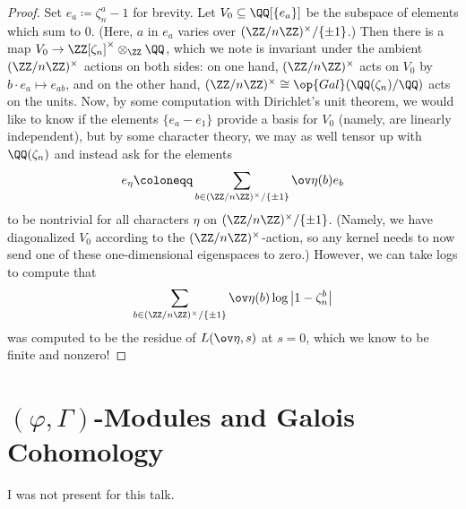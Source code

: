 \documentclass{article}
\begin{document}
\begin{proof}
	Set $e_a\coloneqq\zeta_n^a-1$ for brevity. Let $V_0\subseteq\QQ[\{e_a\}]$ be the subspace of elements which sum to $0$. (Here, $a$ in $e_a$ varies over $(\ZZ/n\ZZ)^\times/\{\pm1\}$.) Then there is a map $V_0\to\ZZ[\zeta_n]^\times\otimes_\ZZ\QQ$, which we note is invariant under the ambient $(\ZZ/n\ZZ)^\times$ actions on both sides: on one hand, $(\ZZ/n\ZZ)^\times$ acts on $V_0$ by $b\cdot e_a\mapsto e_{ab}$, and on the other hand, $(\ZZ/n\ZZ)^\times\cong\op{Gal}(\QQ(\zeta_n)/\QQ)$ acts on the units. Now, by some computation with Dirichlet's unit theorem, we would like to know if the elements $\{e_a-e_1\}$ provide a basis for $V_0$ (namely, are linearly independent), but by some character theory, we may as well tensor up with $\QQ(\zeta_n)$ and instead ask for the elements
	\[e_\eta\coloneqq\sum_{b\in(\ZZ/n\ZZ)^\times/\{\pm1\}}\ov\eta(b)e_b\]
	to be nontrivial for all characters $\eta$ on $(\ZZ/n\ZZ)^\times/\{\pm1\}$. (Namely, we have diagonalized $V_0$ according to the $(\ZZ/n\ZZ)^\times$-action, so any kernel needs to now send one of these one-dimensional eigenspaces to zero.) However, we can take logs to compute that
	\[\sum_{b\in(\ZZ/n\ZZ)^\times/\{\pm1\}}\ov\eta(b)\log\left|1-\zeta_n^b\right|\]
	was computed to be the residue of $L(\ov\eta,s)$ at $s=0$, which we know to be finite and nonzero!
\end{proof}

\section{\texorpdfstring{$(\varphi,\Gamma)$}{(phi, Gamma)}-Modules and Galois Cohomology}
I was not present for this talk.
\end{document}
